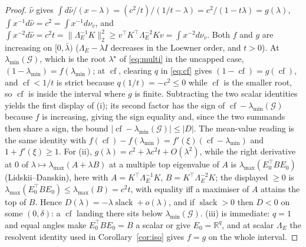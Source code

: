 \documentclass[11pt]{article}
\theoremstyle{remark}
\newcommand{\Gr}{\mathcal{G}}
\newcommand{\Le}{\Lambda_E}
\begin{document}
\begin{proof}
$\hat\nu$ gives $\int d\hat\nu/(x-\lambda)=(c^{2}/t)/(1/t-\lambda)=c^{2}/(1-t\lambda)=g(\lambda)$,
$\int x^{-1}d\hat\nu=c^{2}=\int x^{-1}d\nu_v$, and
$\int x^{-2}d\hat\nu=c^{2}t=\|\Le^{-1}K\|_2^{2}\ge v^{\top}K^{\top}\Le^{-2}Kv=\int x^{-2}d\nu_v$.
Both $f$ and $g$ are increasing on $[0,\bar\lambda)$ ($\Le-\lambda I$ decreases in the Loewner order,
and $t>0$). At $\lambda_{\min}(\Gr)$, which is the root $\lambda^{\star}$ of \eqref{eq:multi} in the
uncapped case, $(1-\lambda_{\min})=f(\lambda_{\min})$; at $\operatorname{cf}$, clearing $q$ in
\eqref{eq:cf} gives $(1-\operatorname{cf})=g(\operatorname{cf})$, and $\operatorname{cf}<1/t$ is
strict because $q(1/t)=-c^{2}\le0$ while $\operatorname{cf}$ is the smaller root, so
$\operatorname{cf}$ is inside the interval where $g$ is finite. Subtracting the two scalar identities
yields the first display of (i); its second factor has the sign of
$\operatorname{cf}-\lambda_{\min}(\Gr)$ because $f$ is increasing, giving the sign equality and, since
the two summands then share a sign, the bound $|\operatorname{cf}-\lambda_{\min}(\Gr)|\le|D|$. The
mean-value reading is the same identity with
$f(\operatorname{cf})-f(\lambda_{\min})=f'(\xi)(\operatorname{cf}-\lambda_{\min})$ and $1+f'(\xi)\ge1$.
For (ii), $g(\lambda)=c^{2}+\lambda c^{2}t+O(\lambda^{2})$, while the right derivative at $0$ of
$\lambda\mapsto\lambda_{\max}(A+\lambda B)$ at a multiple top eigenvalue of $A$ is
$\lambda_{\max}(E_0^{\top}BE_0)$ (Lidskii--Danskin), here with
$A=K^{\top}\Le^{-1}K$, $B=K^{\top}\Le^{-2}K$; the displayed $\ge0$ is
$\lambda_{\max}(E_0^{\top}BE_0)\le\lambda_{\max}(B)=c^{2}t$, with equality iff a maximiser of $A$
attains the top of $B$. Hence $D(\lambda)=-\lambda\operatorname{slack}+o(\lambda)$, and if
$\operatorname{slack}>0$ then $D<0$ on some $(0,\delta)$: a $\operatorname{cf}$ landing there sits
below $\lambda_{\min}(\Gr)$. (iii) is immediate: $q=1$ and equal angles make $E_0^{\top}BE_0=B$ a
scalar or give $E_0=\mathbb R^{q}$, and at scalar $\Le$ the resolvent identity used in
Corollary~\ref{cor:iso} gives $f=g$ on the whole interval.
\end{proof}
\end{document}
